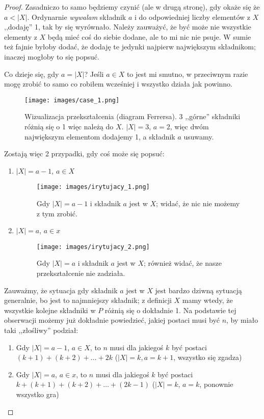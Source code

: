 \begin{proof}
	Zasadniczo to samo będziemy czynić (ale w drugą stronę), gdy okaże się że \(a < |X| \). Ordynarnie \textit{wywalam} składnik \(a\) i do odpowiedniej liczby elementów z \(X\)  ,,dodaję'' 1, tak by się wyrównało. Należy zauważyć, że być może nie wszystkie elementy z \(X\) będą mieć coś do siebie dodane, ale to mi nic nie psuje. W sumie też fajnie byłoby dodać, że dodaję te jedynki najpierw największym składnikom; inaczej mogłoby to się popsuć.

	Co dzieje się, gdy \(a = |X|\)? Jeśli \(a \in X\) to jest mi smutno, w przeciwnym razie mogę zrobić to samo co robiłem wcześniej i wszystko działa jak powinno.

	\begin{figure}[H]
		\centering
		\texttt{[image: images/case\_1.png]}
		\caption{Wizualizacja przekształcenia (diagram Ferrersa). 3 ,,górne'' składniki różnią się o 1 więc należą do \(X\). \(|X| = 3\), \(a = 2\), więc dwóm największym elementom dodajemy 1, a składnik \(a\) usuwamy.}
	\end{figure}

	Zostają więc 2 przypadki, gdy coś może się popsuć:
	\begin{enumerate}
		\item \(|X| = a - 1\), \(a \in X\)
		      \begin{figure}[H]
			      \centering
			      \texttt{[image: images/irytujacy\_1.png]}
			      \caption{Gdy \(|X| = a - 1\) i składnik \(a\) jest w \(X\); widać, że nic nie możemy z tym zrobić.}
		      \end{figure}

		\item \(|X| = a\), \(a \in x\)
		      \begin{figure}[H]
			      \centering
			      \texttt{[image: images/irytujacy\_2.png]}
			      \caption{Gdy \(|X| = a\) i składnik \(a\) jest w \(X\); również widać, że nasze przekształcenie nie zadziała.}
		      \end{figure}
	\end{enumerate}

	Zauważmy, że sytuacja gdy składnik \(a\) jest w \(X\) jest bardzo dziwną sytuacją generalnie, bo jest to najmniejszy składnik; z definicji \(X\) mamy wtedy, że wszystkie kolejne składniki w \(P\) różnią się o dokładnie 1. Na podstawie tej obserwacji możemy już dokładnie powiedzieć, jakiej postaci musi być \(n\), by miało taki ,,złośliwy'' podział:

	\begin{enumerate}
		\item Gdy \(|X| = a - 1\), \(a \in X\), to \(n\) musi dla jakiegoś \(k\) być postaci \((k + 1) + (k + 2) + \dots + 2k \) (\(|X| =k, a = k+1\), wszystko się zgadza)
		\item Gdy \(|X| = a\), \(a \in x\), to \(n\) musi dla jakiegoś \(k\) być postaci \(k + (k+1) + (k+2) + \dots + (2k - 1)\) (\(|X| = k\), \(a = k\), ponownie wszystko gra)
	\end{enumerate}


\end{proof}

